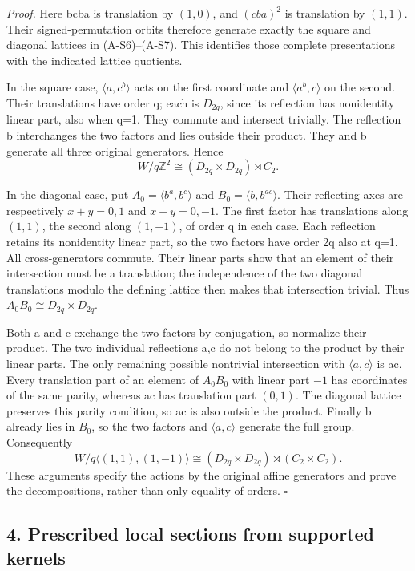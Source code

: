 \documentclass[
  11pt,
  a4paper,
]{article}
\begin{document}
\emph{Proof.} Here bcba is translation by \((1,0)\), and \((cba)^2\) is
translation by \((1,1)\). Their signed-permutation orbits therefore
generate exactly the square and diagonal lattices in (A-S6)--(A-S7).
This identifies those complete presentations with the indicated lattice
quotients.

In the square case, \(\langle a,c^b\rangle\) acts on the first
coordinate and \(\langle a^b,c\rangle\) on the second. Their
translations have order q; each is \(D_{2q}\), since its reflection has
nonidentity linear part, also when q=1. They commute and intersect
trivially. The reflection b interchanges the two factors and lies
outside their product. They and b generate all three original
generators. Hence \[
 W/q\mathbb Z^2\cong(D_{2q}\times D_{2q})\rtimes C_2.
 \tag{A-S6}
\]

In the diagonal case, put \(A_0=\langle b^a,b^c\rangle\) and
\(B_0=\langle b,b^{ac}\rangle\). Their reflecting axes are respectively
\(x+y=0,1\) and \(x-y=0,-1\). The first factor has translations along
\((1,1)\), the second along \((1,-1)\), of order q in each case. Each
reflection retains its nonidentity linear part, so the two factors have
order 2q also at q=1. All cross-generators commute. Their linear parts
show that an element of their intersection must be a translation; the
independence of the two diagonal translations modulo the defining
lattice then makes that intersection trivial. Thus
\(A_0B_0\cong D_{2q}\times D_{2q}\).

Both a and c exchange the two factors by conjugation, so normalize their
product. The two individual reflections a,c do not belong to the product
by their linear parts. The only remaining possible nontrivial
intersection with \(\langle a,c\rangle\) is ac. Every translation part
of an element of \(A_0B_0\) with linear part \(-1\) has coordinates of
the same parity, whereas ac has translation part \((0,1)\). The diagonal
lattice preserves this parity condition, so ac is also outside the
product. Finally b already lies in \(B_0\), so the two factors and
\(\langle a,c\rangle\) generate the full group. Consequently \[
 W/q\langle(1,1),(1,-1)\rangle
 \cong(D_{2q}\times D_{2q})\rtimes(C_2\times C_2).
 \tag{A-S7}
\] These arguments specify the actions by the original affine generators
and prove the decompositions, rather than only equality of orders.
\(\square\)

\subsection{4. Prescribed local sections from supported
kernels}\label{prescribed-local-sections-from-supported-kernels}
\end{document}
